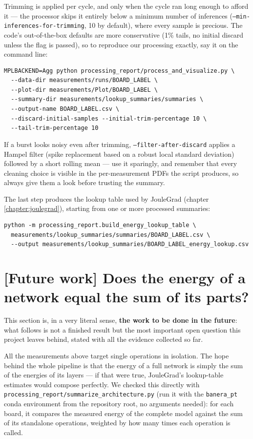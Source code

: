 Trimming is applied per cycle, and only when the cycle ran long enough to
afford it --- the processor skips it entirely below a minimum number of
inferences (\texttt{--min-inferences-}\allowbreak\texttt{for-trimming}, 10 by default), where
every sample is precious. The code's out-of-the-box defaults are more
conservative (1\% tails, no initial discard unless the flag is passed), so
to reproduce our processing exactly, say it on the command line:

\begin{lstlisting}
MPLBACKEND=Agg python processing_report/process_and_visualize.py \
  --data-dir measurements/runs/BOARD_LABEL \
  --plot-dir measurements/Plot/BOARD_LABEL \
  --summary-dir measurements/lookup_summaries/summaries \
  --output-name BOARD_LABEL.csv \
  --discard-initial-samples --initial-trim-percentage 10 \
  --tail-trim-percentage 10
\end{lstlisting}

If a burst looks noisy even after trimming,
\texttt{--filter-after-discard} applies a Hampel filter (spike replacement
based on a robust local standard deviation) followed by a short rolling
mean --- use it sparingly, and remember that every cleaning choice is
visible in the per-measurement PDFs the script produces, so always give
them a look before trusting the summary.

The last step produces the lookup table used by JouleGrad (chapter \ref{chapter:joulegrad}), starting from one or more processed summaries:

\begin{lstlisting}
python -m processing_report.build_energy_lookup_table \
  measurements/lookup_summaries/summaries/BOARD_LABEL.csv \
  --output measurements/lookup_summaries/BOARD_LABEL_energy_lookup.csv
\end{lstlisting}

\section{[Future
work] Does the energy of a network equal the sum of its parts?}
\label{sec:sum-of-parts}

This section is, in a very literal sense, \textbf{the work to be done in
the future}: what follows is not a finished result but the most important
open question this project leaves behind, stated with all the evidence
collected so far.

All the measurements above target single operations in isolation. The hope
behind the whole pipeline is that the energy of a full network is simply the
sum of the energies of its layers --- if that were true, JouleGrad's
lookup-table estimates would compose perfectly. We checked this directly
with \texttt{processing\_report/summarize\_architecture.py} (run it with
the \texttt{banera\_pt} conda environment from the repository root, no
arguments needed): for each board, it compares the measured energy of the
complete model against the sum of its standalone operations, weighted by
how many times each operation is called.

